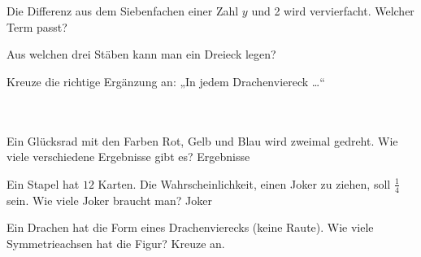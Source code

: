 \documentclass[11pt]{article}
\begin{document}
\begin{aufgabe}{Die Differenz aus dem Siebenfachen einer Zahl $y$ und 2 wird vervierfacht. Welcher Term passt? \\    }
\end{aufgabe}

\begin{aufgabe}{Aus welchen drei Stäben kann man ein Dreieck legen? \\   }
\end{aufgabe}

\begin{aufgabe}{Kreuze die richtige Ergänzung an: „In jedem Drachenviereck …“\\ \\ \\ }
\end{aufgabe}

\begin{aufgabe}{Ein Glücksrad mit den Farben Rot, Gelb und Blau wird zweimal gedreht. Wie viele verschiedene Ergebnisse gibt es? \leerfeld Ergebnisse}
\end{aufgabe}

\begin{aufgabe}{Ein Stapel hat $12$ Karten. Die Wahrscheinlichkeit, einen Joker zu ziehen, soll $\frac{1}{4}$ sein. Wie viele Joker braucht man? \leerfeld Joker}
\end{aufgabe}

\begin{aufgabe}{\begin{minipage}[t]{0.6\linewidth}Ein Drachen hat die Form eines Drachenvierecks (keine Raute). Wie viele Symmetrieachsen hat die Figur? Kreuze an. \\      \end{minipage}\hfill\begin{minipage}[t]{0.37\linewidth}\vspace{0pt}
\end{minipage}}
\end{aufgabe}
\end{document}
